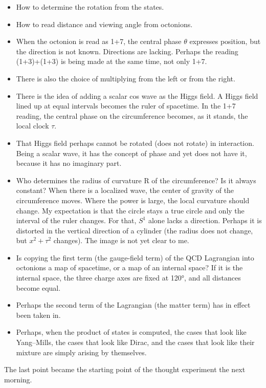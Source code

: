 \documentclass[
  a4paper,
]{article}
\providecommand{\tightlist}{%
  \setlength{\itemsep}{0pt}\setlength{\parskip}{0pt}}
\begin{document}
\begin{itemize}
\tightlist
\item
  How to determine the rotation from the states.
\item
  How to read distance and viewing angle from octonions.
\item
  When the octonion is read as 1+7, the central phase \(\theta\)
  expresses position, but the direction is not known. Directions are
  lacking. Perhaps the reading (1+3)+(1+3) is being made at the same
  time, not only 1+7.
\item
  There is also the choice of multiplying from the left or from the
  right.
\item
  There is the idea of adding a scalar cos wave as the Higgs field. A
  Higgs field lined up at equal intervals becomes the ruler of
  spacetime. In the 1+7 reading, the central phase on the circumference
  becomes, as it stands, the local clock \(\tau\).
\item
  That Higgs field perhaps cannot be rotated (does not rotate) in
  interaction. Being a scalar wave, it has the concept of phase and yet
  does not have it, because it has no imaginary part.
\item
  Who determines the radius of curvature R of the circumference? Is it
  always constant? When there is a localized wave, the center of gravity
  of the circumference moves. Where the power is large, the local
  curvature should change. My expectation is that the circle stays a
  true circle and only the interval of the ruler changes. For that,
  \(S^1\) alone lacks a direction. Perhaps it is distorted in the
  vertical direction of a cylinder (the radius does not change, but
  \(x^2 + \tau^2\) changes). The image is not yet clear to me.
\item
  Is copying the first term (the gauge-field term) of the QCD Lagrangian
  into octonions a map of spacetime, or a map of an internal space? If
  it is the internal space, the three charge axes are fixed at 120°, and
  all distances become equal.
\item
  Perhaps the second term of the Lagrangian (the matter term) has in
  effect been taken in.
\item
  Perhaps, when the product of states is computed, the cases that look
  like Yang--Mills, the cases that look like Dirac, and the cases that
  look like their mixture are simply arising by themselves.
\end{itemize}

The last point became the starting point of the thought experiment the
next morning.
\end{document}
